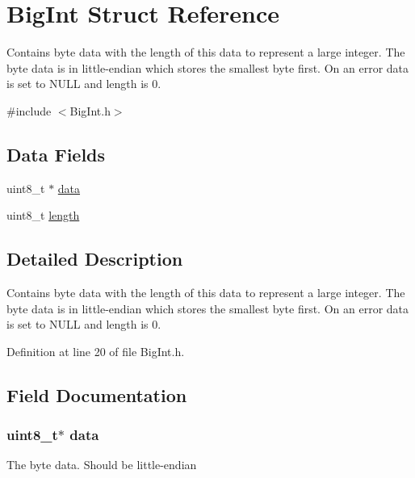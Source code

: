 \hypertarget{struct_m_i_big_int}{
\section{BigInt Struct Reference}
\label{struct_m_i_big_int}
}


Contains byte data with the length of this data to represent a large integer. The byte data is in little-\/endian which stores the smallest byte first. On an error data is set to NULL and length is 0.  




{\ttfamily \#include $<$BigInt.h$>$}

\subsection*{Data Fields}
\begin{DoxyCompactItemize}
\item 
uint8\_\-t $\ast$ \hyperlink{struct_m_i_big_int_abe222f6d3581e7920dcad5306cc906a8}{data}
\item 
uint8\_\-t \hyperlink{struct_m_i_big_int_ab2b3adeb2a67e656ff030b56727fd0ac}{length}
\end{DoxyCompactItemize}


\subsection{Detailed Description}
Contains byte data with the length of this data to represent a large integer. The byte data is in little-\/endian which stores the smallest byte first. On an error data is set to NULL and length is 0. 

Definition at line 20 of file BigInt.h.



\subsection{Field Documentation}
\hypertarget{struct_m_i_big_int_abe222f6d3581e7920dcad5306cc906a8}{
\subsubsection[{data}]{\setlength{\rightskip}{0pt plus 5cm}uint8\_\-t$\ast$ {\bf data}}}
\label{struct_m_i_big_int_abe222f6d3581e7920dcad5306cc906a8}
The byte data. Should be little-\/endian 

